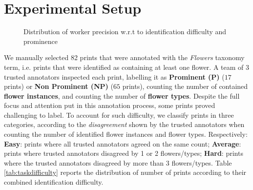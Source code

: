 \documentclass{sig-alternate-2013}
\begin{document}
\section{Experimental Setup}

\begin{figure}[ht]
      \centering
      \quad
      \quad
  \caption{Distribution of worker precision w.r.t to identification difficulty and prominence}\label{fig:workerscountrystat}
\end{figure}


We manually selected 82 prints that were annotated with the \textit{Flowers} taxonomy term, i.e. prints that were identified as containing at least one flower. A team of 3 trusted annotators inspected each print, labelling it as \textbf{Prominent (P)} ($17$ prints) or \textbf{Non Prominent (NP)} ($65$ prints), counting the number of contained \textbf{flower instances}, and counting the number of \textbf{flower types}. 
Despite the full focus and attention put in this annotation process, some prints proved challenging to label. To account for such difficulty, we classify prints in three categories, according to the \textit{disagreement} shown by the trusted annotators when counting the number of identified flower instances and flower types. Respectively: \textbf{Easy}: prints where all trusted annotators agreed on the same count; \textbf{Average}: prints where trusted annotators disagreed by 1 or 2 flowers/types; \textbf{Hard}: prints where the trusted annotators disagreed by more than 3 flowers/types. Table \ref{tab:taskdifficulty} reports the distribution of number of prints according to their combined identification difficulty. %
\end{document}
